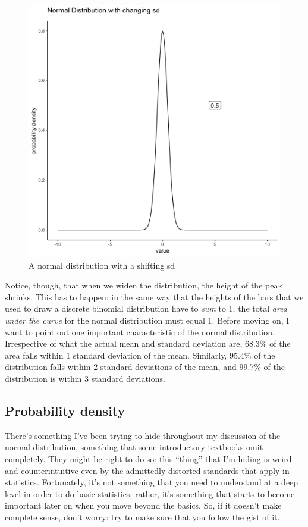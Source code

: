 \documentclass[]{book}
\begin{document}
\begin{figure}
\centering
\includegraphics{gifs/normalMovingSD-1.gif}
\caption{\label{fig:4normalSDShift}A normal distribution with a shifting sd}
\end{figure}

Notice, though, that when we widen the distribution, the height of the peak shrinks. This has to happen: in the same way that the heights of the bars that we used to draw a discrete binomial distribution have to \emph{sum} to 1, the total \emph{area under the curve} for the normal distribution must equal 1. Before moving on, I want to point out one important characteristic of the normal distribution. Irrespective of what the actual mean and standard deviation are, 68.3\% of the area falls within 1 standard deviation of the mean. Similarly, 95.4\% of the distribution falls within 2 standard deviations of the mean, and 99.7\% of the distribution is within 3 standard deviations.

\hypertarget{probability-density}{%
\subsection{Probability density}\label{probability-density}}

There's something I've been trying to hide throughout my discussion of the normal distribution, something that some introductory textbooks omit completely. They might be right to do so: this ``thing'' that I'm hiding is weird and counterintuitive even by the admittedly distorted standards that apply in statistics. Fortunately, it's not something that you need to understand at a deep level in order to do basic statistics: rather, it's something that starts to become important later on when you move beyond the basics. So, if it doesn't make complete sense, don't worry: try to make sure that you follow the gist of it.
\end{document}
